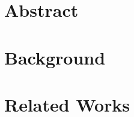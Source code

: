 \documentclass[11pt]{article}
\begin{document}
    

    \newpage
    \chapter{Abstract}
    

    \newpage
    \chapter{Background}
    

    \newpage
    \chapter{Related Works}
    
    
\end{document}
